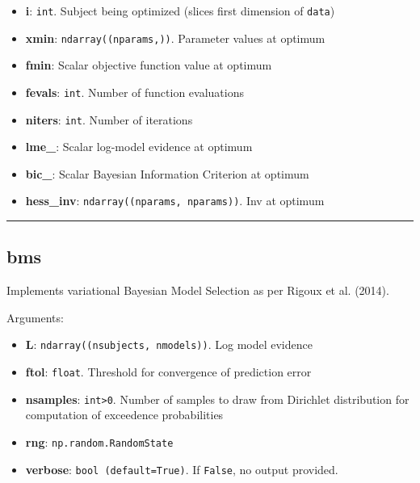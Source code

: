 \begin{itemize}
\tightlist
\item
  \textbf{i}: \texttt{int}. Subject being optimized (slices first
  dimension of \texttt{data})
\item
  \textbf{xmin}: \texttt{ndarray((nparams,))}. Parameter values at
  optimum
\item
  \textbf{fmin}: Scalar objective function value at optimum
\item
  \textbf{fevals}: \texttt{int}. Number of function evaluations
\item
  \textbf{niters}: \texttt{int}. Number of iterations
\item
  \textbf{lme\_}: Scalar log-model evidence at optimum
\item
  \textbf{bic\_}: Scalar Bayesian Information Criterion at optimum
\item
  \textbf{hess\_inv}: \texttt{ndarray((nparams,\ nparams))}. Inv at
  optimum
\end{itemize}

\begin{center}\rule{0.5\linewidth}{\linethickness}\end{center}

\subsection{bms}\label{bms}

\begin{Shaded}
\begin{Highlighting}[]
\OperatorTok{=}\OperatorTok{=}\OperatorTok{=<}\OperatorTok{>}\OperatorTok{=}\NormalTok{)}
\end{Highlighting}
\end{Shaded}

Implements variational Bayesian Model Selection as per Rigoux et al.
(2014).

Arguments:

\begin{itemize}
\tightlist
\item
  \textbf{L}: \texttt{ndarray((nsubjects,\ nmodels))}. Log model
  evidence
\item
  \textbf{ftol}: \texttt{float}. Threshold for convergence of prediction
  error
\item
  \textbf{nsamples}: \texttt{int\textgreater{}0}. Number of samples to
  draw from Dirichlet distribution for computation of exceedence
  probabilities
\item
  \textbf{rng}: \texttt{np.random.RandomState}
\item
  \textbf{verbose}: \texttt{bool\ (default=True)}. If \texttt{False}, no
  output provided.
\end{itemize}


